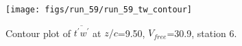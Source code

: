 \begin{figure}[H]
\centering
\texttt{[image: figs/run\_59/run\_59\_tw\_contour]}
\caption{Contour plot of $\overline{t^\prime w^\prime}$ at $z/c$=9.50, $V_{free}$=30.9, station 6.}
\label{fig:run_59_tw_contour}
\end{figure}


